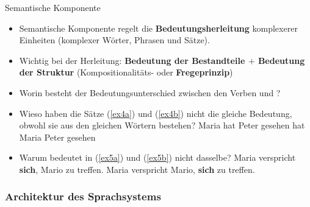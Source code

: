 \begin{frame}{Semantische Komponente}
	
	\begin{itemize}
		\item Semantische Komponente regelt die \textbf{Bedeutungsherleitung} komplexerer Einheiten (komplexer Wörter, Phrasen und Sätze).
\medskip
		\item Wichtig bei der Herleitung: \textbf{Bedeutung der Bestandteile $+$ Bedeutung der Struktur} (Kompositionalitäts- oder \textbf{Fregeprinzip})
\pause
\bigskip			
	\item[\ra] Worin besteht der Bedeutungsunterschied zwischen den Verben  und ?
\pause	
	\item[\ra] Wieso haben die Sätze (\ref{ex4a}) und (\ref{ex4b}) nicht die gleiche Bedeutung, obwohl sie aus den gleichen Wörtern bestehen?
	\ea
		\ea Maria hat Peter gesehen \label{ex4a}
		\ex hat Maria Peter gesehen \label{ex4b}
		\z
	\z 
\pause
	\item[\ra] Warum bedeutet  in (\ref{ex5a}) und (\ref{ex5b}) nicht dasselbe?
	\ea
		\ea Maria verspricht \textbf{sich}, Mario zu treffen. \label{ex5a}
		\ex Maria verspricht Mario, \textbf{sich} zu treffen. \label{ex5b}
		\z
	\z
	\end{itemize}
	
\end{frame}


\subsubsection{Architektur des Sprachsystems}
		
